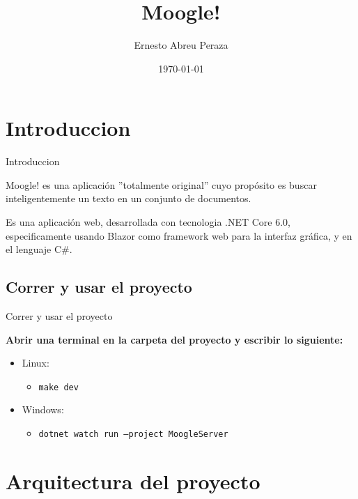 \documentclass[11pt]{beamer}
\author{Ernesto Abreu Peraza}
\title{Moogle!}
\institute{Universidad de la Habana}
\date{\today}
\begin{document}
\begin{frame}
\titlepage
\end{frame}

\begin{frame}
\tableofcontents
\end{frame}

\section{Introduccion}

\begin{frame}{Introduccion}

Moogle! es una aplicación ”totalmente original” cuyo propósito es buscar inteligentemente un texto en un conjunto de documentos.

Es una aplicación web, desarrollada con tecnologia .NET Core 6.0, especificamente
usando Blazor como framework web para la interfaz gráfica, y en el lenguaje C\#.

\end{frame}

\subsection{Correr y usar el proyecto}

\begin{frame}{Correr y usar el proyecto}

    \textbf{Abrir una terminal en la carpeta del proyecto y escribir lo siguiente:}
    
    \begin{itemize}
        \item Linux:
              \begin{itemize} \item \texttt{make dev} \end{itemize}
        \item Windows:
              \begin{itemize} \item \texttt{dotnet watch run --project MoogleServer}\end{itemize}
    \end{itemize}

\end{frame}

\section{Arquitectura del proyecto}
\end{document}
